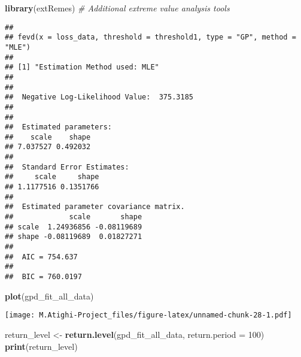 \documentclass[
  12pt,
]{article}
\newenvironment{Shaded}{\begin{snugshade}}{\end{snugshade}}
\newcommand{\AttributeTok}[1]{\textcolor[rgb]{0.13,0.29,0.53}{#1}}
\newcommand{\CommentTok}[1]{\textcolor[rgb]{0.56,0.35,0.01}{\textit{#1}}}
\newcommand{\DecValTok}[1]{\textcolor[rgb]{0.00,0.00,0.81}{#1}}
\newcommand{\FloatTok}[1]{\textcolor[rgb]{0.00,0.00,0.81}{#1}}
\newcommand{\FunctionTok}[1]{\textcolor[rgb]{0.13,0.29,0.53}{\textbf{#1}}}
\newcommand{\NormalTok}[1]{#1}
\newcommand{\OtherTok}[1]{\textcolor[rgb]{0.56,0.35,0.01}{#1}}
\newcommand{\SpecialCharTok}[1]{\textcolor[rgb]{0.81,0.36,0.00}{\textbf{#1}}}
\newcommand{\StringTok}[1]{\textcolor[rgb]{0.31,0.60,0.02}{#1}}
\begin{document}
\begin{Shaded}
\begin{Highlighting}[]
\FunctionTok{library}\NormalTok{(extRemes)    }\CommentTok{\# Additional extreme value analysis tools}
\end{Highlighting}
\end{Shaded}

\begin{Shaded}
\end{Shaded}

\begin{verbatim}
## 
## fevd(x = loss_data, threshold = threshold1, type = "GP", method = "MLE")
## 
## [1] "Estimation Method used: MLE"
## 
## 
##  Negative Log-Likelihood Value:  375.3185 
## 
## 
##  Estimated parameters:
##    scale    shape 
## 7.037527 0.492032 
## 
##  Standard Error Estimates:
##     scale     shape 
## 1.1177516 0.1351766 
## 
##  Estimated parameter covariance matrix.
##             scale       shape
## scale  1.24936856 -0.08119689
## shape -0.08119689  0.01827271
## 
##  AIC = 754.637 
## 
##  BIC = 760.0197
\end{verbatim}

\begin{Shaded}
\begin{Highlighting}[]
\FunctionTok{plot}\NormalTok{(gpd\_fit\_all\_data)}
\end{Highlighting}
\end{Shaded}

\texttt{[image: M.Atighi-Project\_files/figure-latex/unnamed-chunk-28-1.pdf]}

\begin{Shaded}
\begin{Highlighting}[]
\NormalTok{return\_level }\OtherTok{\textless{}{-}} \FunctionTok{return.level}\NormalTok{(gpd\_fit\_all\_data, }\AttributeTok{return.period =} \DecValTok{100}\NormalTok{)}
\FunctionTok{print}\NormalTok{(return\_level)}
\end{Highlighting}
\end{Shaded}
\end{document}
